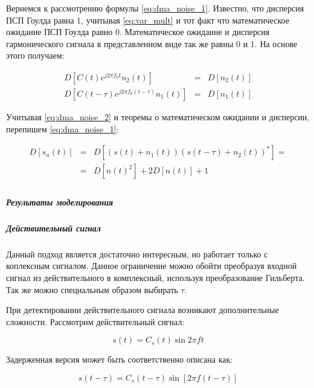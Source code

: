 Вернемся к рассмотрению формулы \ref{eq:dma_noise_1}. Известно, что дисперсия ПСП Гоулда равна 1, учитывая \ref{eq:var_mult}
и тот факт что математическое ожидание ПСП Гоулда равно 0. Математическое ожидаине и дисперсия гармонического сигнала в
представленном виде так же равны 0 и 1. На основе этого получаем:
\begin{center}
\begin{eqnarray}
	\label{eq:dma_noise_2}
	D[C(t)e^{j2{\pi}f_{0}t}n_{2}(t)] & = & D[n_{2}(t)] \nonumber \\
	D[C(t-\tau)e^{j2{\pi}f_{0}(t-\tau)}n_{1}(t)] & = & D[n_{1}(t)]
\end{eqnarray}
\end{center}

Учитывая \ref{eq:dma_noise_2} и теоремы о математическом ожидании и дисперсии, перепишем \ref{eq:dma_noise_1}:
\begin{center}
\begin{eqnarray}
	D[s_{n}(t)] & = & D[(s(t)+n_{1}(t))(s(t-\tau)+n_{2}(t))^{*}]=\nonumber \\
	& = & D[n(t)^{2}] + 2D[n(t)] + 1 \label{eq:dma_noise_3} \\
\end{eqnarray}
\end{center}

\subparagraph{Результаты моделирования}
\label{sssec:dma_simulate}

\subparagraph{Действительный сигнал}

Данный подход является достаточно интересным, но работает только с коплексным сигналом. Данное ограничение можно
обойти преобразуя входной сигнал из действительного в комплексный, используя преобразование Гильберта.
Так же можно специальным образом выбирать ${\tau}$.

При детектировании действительного сигнала возникают дополнительные сложности. Рассмотрим действительный сигнал:
\begin{center}
\begin{equation}
	\label{eq:dma_real1}
	s(t) = C_s(t) \sin{2\pi ft}
\end{equation}
\end{center}

Задерженная версия может быть соответственно описана как:
\begin{center}
\begin{equation}
	\label{eq:dma_real2}
	s(t - \tau) = C_s(t-\tau) \sin{[2\pi f(t-\tau)]}
\end{equation}
\end{center}

